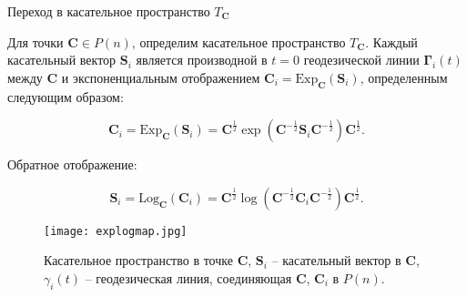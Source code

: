 \documentclass{beamer}
\begin{document}
\begin{frame}{Переход в касательное пространство $T_{\mathbf{C}}$}

\small

Для точки $\mathbf{C} \in P(n)$, определим касательное пространство $T_{\mathbf{C}}$. Каждый касательный вектор $\mathbf{S}_i$ является производной в $t = 0$ геодезической линии $\mathbf{\Gamma}_i(t)$ между $\mathbf{C}$ и экспоненциальным отображением $\mathbf{C}_i = \text{Exp}_{\mathbf{C}}(\mathbf{S}_i)$, определенным следующим образом:

\begin{equation*}
    \mathbf{C}_i = \text{Exp}_{\mathbf{C}}(\mathbf{S}_i) = \mathbf{C}^{\frac12} \exp( \mathbf{C}^{-\frac12}\mathbf{S}_i\mathbf{C}^{-\frac12})\mathbf{C}^{\frac12}.
\end{equation*}

Обратное отображение:

\begin{equation*}
    \mathbf{S}_i = \text{Log}_{\mathbf{C}}(\mathbf{C}_i) = \mathbf{C}^{\frac12} \log( \mathbf{C}^{-\frac12}\mathbf{C}_i\mathbf{C}^{-\frac12})\mathbf{C}^{\frac12}.
\end{equation*}

\begin{figure}[h]
  \begin{minipage}{0.5\textwidth}
    \texttt{[image: explogmap.jpg]}
  
  \end{minipage}\hfill
  \caption*{Касательное пространство в точке $\mathbf{C}$, $\mathbf{S}_i$ -- касательный вектор в $\mathbf{C}$, $\gamma_i(t)$ -- геодезическая линия, соединяющая $\mathbf{C}$, $\mathbf{C}_i$ в $P(n)$.}
\end{figure}

\end{frame}
\end{document}
